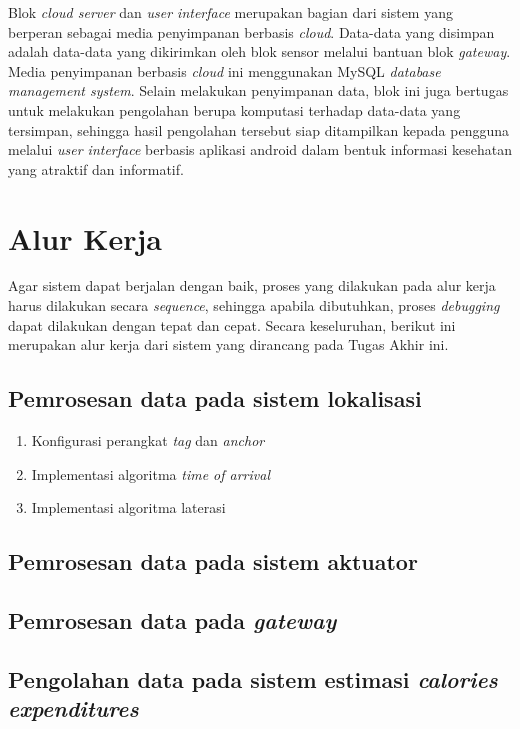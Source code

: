 Blok \textit{cloud server} dan \textit{user interface} merupakan bagian dari sistem yang berperan sebagai media penyimpanan berbasis \textit{cloud}. Data-data yang disimpan adalah data-data yang dikirimkan oleh blok sensor melalui bantuan blok \textit{gateway}. Media penyimpanan berbasis \textit{cloud} ini menggunakan MySQL \textit{database management system}. Selain melakukan penyimpanan data, blok ini juga bertugas untuk melakukan pengolahan berupa komputasi terhadap data-data yang tersimpan, sehingga hasil pengolahan tersebut siap ditampilkan kepada pengguna melalui \textit{user interface} berbasis aplikasi android dalam bentuk informasi kesehatan yang atraktif dan informatif.

\vspace{1ex}
\section{Alur Kerja}
\vspace{1ex}

Agar sistem dapat berjalan dengan baik, proses yang dilakukan pada alur kerja harus dilakukan secara \textit{sequence}, sehingga apabila dibutuhkan, proses \textit{debugging} dapat dilakukan dengan tepat dan cepat. Secara keseluruhan, berikut ini merupakan alur kerja dari sistem yang dirancang pada Tugas Akhir ini.
\subsection{Pemrosesan data pada sistem lokalisasi}
\vspace{1ex}
\begin{enumerate}[nolistsep]
	\item Konfigurasi perangkat \textit{tag} dan \textit{anchor}
	\item Implementasi algoritma \textit{time of arrival}
	\item Implementasi algoritma laterasi
\end{enumerate}
\subsection{Pemrosesan data pada sistem aktuator}
\vspace{1ex}
\subsection{Pemrosesan data pada \textit{gateway}}
\vspace{1ex}
\subsection{Pengolahan data pada sistem estimasi \textit{calories expenditures}}
\vspace{1ex}
